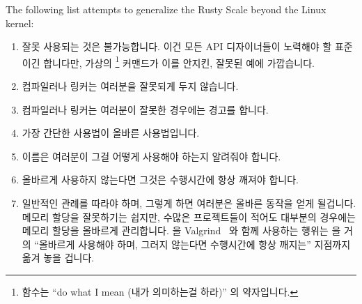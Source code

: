 The following list attempts to generalize the Rusty Scale beyond the
Linux kernel:
\fi

\begin{enumerate}
\item	잘못 사용되는 것은 불가능합니다.
	이건 모든 API 디자이너들이 노력해야 할 표준이긴 합니다만, 가상의 \footnote{
	 함수는 ``do what I mean (내가 의미하는걸 하라)'' 의
	약자입니다.}
	커맨드가 이를 안지킨, 잘못된 예에 가깝습니다.
\item	컴파일러나 링커는 여러분을 잘못되게 두지 않습니다.
\item	컴파일러나 링커는 여러분이 잘못한 경우에는 경고를 합니다.
\item	가장 간단한 사용법이 올바른 사용법입니다.
\item	이름은 여러분이 그걸 어떻게 사용해야 하는지 알려줘야 합니다.
\item	올바르게 사용하지 않는다면 그것은 수행시간에 항상 깨져야 합니다.
\item	일반적인 관례를 따라야 하며, 그렇게 하면 여러분은 올바른 동작을 얻게
	될겁니다.
	메모리 할당을 잘못하기는 쉽지만, 수많은 프로젝트들이 적어도 대부분의
	경우에는 메모리 할당을 올바르게 관리합니다.
	 을 Valgrind~\cite{ValgrindHomePage} 와 함께 사용하는
	행위는  을 거의 ``올바르게 사용해야 하며, 그러지 않는다면
	수행시간에 항상 깨지는'' 지점까지 옮겨 놓을 겁니다.
\iffalse


\end{enumerate}
